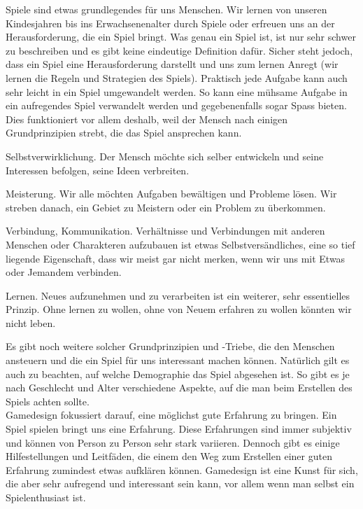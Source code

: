 \documentclass[12pt,a4paper,titlepage]{article}
\begin{document}
		Spiele sind etwas grundlegendes für uns Menschen. Wir lernen von unseren Kindesjahren bis ins Erwachsenenalter durch Spiele oder erfreuen uns an der Herausforderung, die ein Spiel bringt. Was genau ein Spiel ist, ist nur sehr schwer zu beschreiben und es gibt keine eindeutige Definition dafür. Sicher steht jedoch, dass ein Spiel eine Herausforderung darstellt und uns zum lernen Anregt (wir lernen die Regeln und Strategien des Spiels). Praktisch jede Aufgabe kann auch sehr leicht in ein Spiel umgewandelt werden. So kann eine mühsame Aufgabe in ein aufregendes Spiel verwandelt werden und gegebenenfalls sogar Spass bieten. Dies funktioniert vor allem deshalb, weil der Mensch nach einigen Grundprinzipien strebt, die das Spiel ansprechen kann.
		\begin{itemize*}
			\item Selbstverwirklichung. Der Mensch möchte sich selber entwickeln und seine Interessen befolgen, seine Ideen verbreiten.
			\item Meisterung. Wir alle möchten Aufgaben bewältigen und Probleme lösen. Wir streben danach, ein Gebiet zu Meistern oder ein Problem zu überkommen.
			\item Verbindung, Kommunikation. Verhältnisse und Verbindungen mit anderen Menschen oder Charakteren aufzubauen ist etwas Selbstversändliches, eine so tief liegende Eigenschaft, dass wir meist gar nicht merken, wenn wir uns mit Etwas oder Jemandem verbinden.
			\item Lernen. Neues aufzunehmen und zu verarbeiten ist ein weiterer, sehr essentielles Prinzip. Ohne lernen zu wollen, ohne von Neuem erfahren zu wollen könnten wir nicht leben.
		\end{itemize*}
		Es gibt noch weitere solcher Grundprinzipien und -Triebe, die den Menschen ansteuern und die ein Spiel für uns interessant machen können. Natürlich gilt es auch zu beachten, auf welche Demographie das Spiel abgesehen ist. So gibt es je nach Geschlecht und Alter verschiedene Aspekte, auf die man beim Erstellen des Spiels achten sollte.\\
		
		Gamedesign fokussiert darauf, eine möglichst gute Erfahrung zu bringen. Ein Spiel spielen bringt uns eine Erfahrung. Diese Erfahrungen sind immer subjektiv und können von Person zu Person sehr stark variieren. Dennoch gibt es einige Hilfestellungen und Leitfäden, die einem den Weg zum Erstellen einer guten Erfahrung zumindest etwas aufklären können. Gamedesign ist eine Kunst für sich, die aber sehr aufregend und interessant sein kann, vor allem wenn man selbst ein Spielenthusiast ist. 
		
\end{document}
